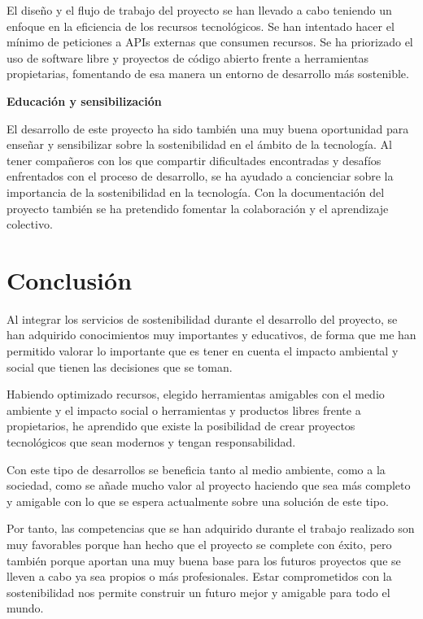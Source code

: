 El diseño y el flujo de trabajo del proyecto se han llevado a cabo teniendo un enfoque en la eficiencia de los recursos tecnológicos. Se han intentado hacer el mínimo de peticiones a APIs externas que consumen recursos. Se ha priorizado el uso de software libre y proyectos de código abierto frente a herramientas propietarias, fomentando de esa manera un entorno de desarrollo más sostenible.

\textbf{Educación y sensibilización}

El desarrollo de este proyecto ha sido también una muy buena oportunidad para enseñar y sensibilizar sobre la sostenibilidad en el ámbito de la tecnología. Al tener compañeros con los que compartir dificultades encontradas y desafíos enfrentados con el proceso de desarrollo, se ha ayudado a concienciar sobre la importancia de la sostenibilidad en la tecnología. Con la documentación del proyecto también se ha pretendido fomentar la colaboración y el aprendizaje colectivo.

\section{Conclusión}

Al integrar los servicios de sostenibilidad durante el desarrollo del proyecto, se han adquirido conocimientos muy importantes y educativos, de forma que me han permitido valorar lo importante que es tener en cuenta el impacto ambiental y social que tienen las decisiones que se toman.

Habiendo optimizado recursos, elegido herramientas amigables con el medio ambiente y el impacto social o herramientas y productos libres frente a propietarios, he aprendido que existe la posibilidad de crear proyectos tecnológicos que sean modernos y tengan responsabilidad.

Con este tipo de desarrollos se beneficia tanto al medio ambiente, como a la sociedad, como se añade mucho valor al proyecto haciendo que sea más completo y amigable con lo que se espera actualmente sobre una solución de este tipo.

Por tanto, las competencias que se han adquirido durante el trabajo realizado son muy favorables porque han hecho que el proyecto se complete con éxito, pero también porque aportan una muy buena base para los futuros proyectos que se lleven a cabo ya sea propios o más profesionales. Estar comprometidos con la sostenibilidad nos permite construir un futuro mejor y amigable para todo el mundo.